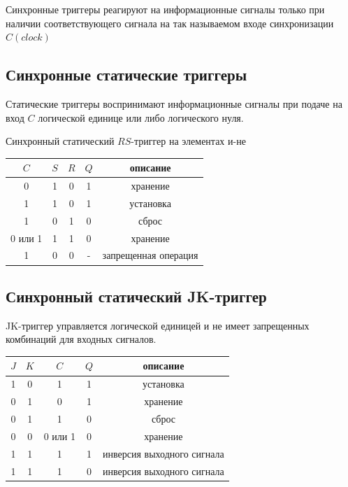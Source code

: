 \documentclass[a4paper]{article}
\begin{document}
Синхронные триггеры реагируют на информационные сигналы только при наличии соответствующего сигнала на так называемом входе синхронизации $C(clock)$

\subsection{Синхронные статические триггеры}
Статические триггеры воспринимают информационные сигналы при подаче на вход $C$ логической единице или либо логического нуля.

Синхронный статический $RS$-триггер на элементах и-не

\begin{table}[ht]
\centering
\begin{tabular}{|c|c|c|c|c|}
    \hline
    $C$ & $S$ & $R$ & $Q$ & описание \\
    \hline
    0 & 1 & 0 & 1 & хранение\\
    1 & 1 & 0 & 1 & установка \\
    1 & 0 & 1 & 0 & сброс \\
    0 или 1 & 1 & 1 & 0 & хранение \\
    1 & 0 & 0 & - & запрещенная операция \\
    \hline
\end{tabular}
\end{table}

\subsection{Синхронный статический JK-триггер}

JK-триггер управляется логической единицей и не имеет запрещенных комбинаций для входных сигналов.

\begin{table}[ht]
\centering
\begin{tabular}{|c|c|c|c|c|}
    \hline
    $J$ & $K$ & $C$ & $Q$  & описание \\
    \hline
    1 & 0 & 1 & 1 & установка\\
    0 & 1 & 0 & 1 & хранение \\
    0 & 1 & 1 & 0 & сброс \\
    0 & 0 & 0 или 1 & 0 & хранение \\
    1 & 1 & 1 & 1 & инверсия выходного сигнала \\
    1 & 1 & 1 & 0 & инверсия выходного сигнала \\
    \hline
\end{tabular}
\end{table}
\end{document}
